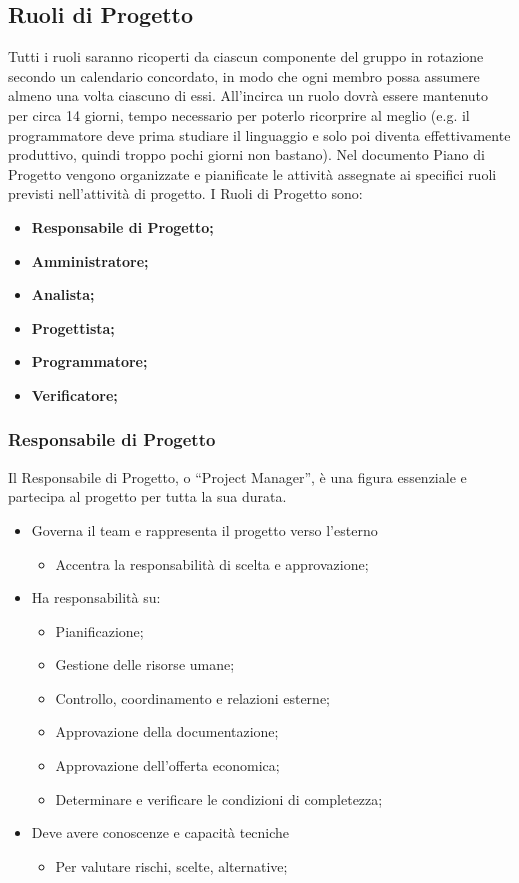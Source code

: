 \subsection{Ruoli di Progetto}
Tutti i ruoli saranno ricoperti da ciascun componente del gruppo in rotazione secondo un calendario concordato, in modo che ogni membro possa assumere almeno una volta ciascuno di essi. All'incirca un ruolo dovrà essere mantenuto per circa 14 giorni, tempo necessario per poterlo ricorprire al meglio (e.g. il programmatore deve prima studiare il linguaggio e solo poi diventa effettivamente produttivo, quindi troppo pochi giorni non bastano).
Nel documento Piano di Progetto vengono organizzate e pianificate le attività assegnate ai specifici ruoli previsti nell’attività di progetto. I Ruoli di Progetto sono:
\begin{itemize}
\item{\textbf{Responsabile di Progetto;}}
\item{\textbf{Amministratore;}}
\item{\textbf{Analista;}}
\item{\textbf{Progettista;}}
\item{\textbf{Programmatore;}}
\item{\textbf{Verificatore;}}
\end{itemize}

\subsubsection{Responsabile di Progetto}
Il Responsabile di Progetto,  o  “Project  Manager”,  è una figura essenziale e partecipa al  progetto per tutta la sua durata.  
\begin{itemize}
\item{Governa il team e rappresenta il progetto verso l'esterno}
	\begin{itemize}
	\item{Accentra la responsabilità di scelta e approvazione;}
	\end{itemize}
\item{Ha responsabilità su:}
	\begin{itemize}
	\item{Pianificazione;}
	\item{Gestione delle risorse umane;}
	\item{Controllo, coordinamento e relazioni esterne;}
	\item{Approvazione della documentazione;}
	\item{Approvazione dell’offerta economica;}
	\item{Determinare e verificare le condizioni di completezza;}
	\end{itemize}
\item{Deve avere conoscenze e capacità tecniche}
	\begin{itemize}
	\item{Per valutare rischi, scelte, alternative;}
	\end{itemize}
\end{itemize}

